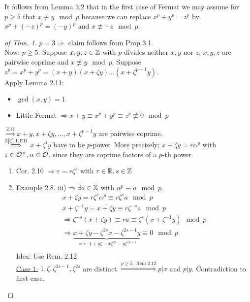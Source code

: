\begin{Bem}
It follows from Lemma 3.2 that in the first case of Fermat we may assume for $p \geq 5$ that $x \not\equiv y \mod p$ because we can replace $x^p + y^p = z^p $ by $x^p+(-z)^p=(-y)^p$ and $x \not\equiv -z \mod p$.
\end{Bem}

\begin{proof}[of Thm. 1]
$p=3 \Rightarrow $ claim follows from Prop 3.1.\\
Now: $p \geq 5$. Suppose $x,y,z \in \mathbb{Z}$ with $p$ divides neither $x,y$ nor $z$, $x,y,z$ are pairwise coprime and $x \not\equiv y \mod p$. Suppose $z^p = x^p +y^p=(x+y)(x+\zeta y)\dots (x+\zeta^{p-1}y)$.\\
Apply Lemma 2.11:
\begin{itemize}
\item $\gcd(x,y)=1$ \checkmark
\item Little Fermat $\Rightarrow x+y \equiv x^p+y^p\equiv z^p \not \equiv 0 \mod p$
\end{itemize}
$\stackrel{2.11}{\Longrightarrow} x+y, x+\zeta y, \dots, x+\zeta^{p-1}y$ are pairwise coprime.\\
$\stackrel{\mathbb{Z}[\zeta] \text{ UFD}}{\Longrightarrow}$ \glqq $x+\zeta^i y$ have to be $p$-power\grqq \ More precisely: $x+\zeta y = \varepsilon \alpha^p$ with $\varepsilon \in \mathcal{O}^\times, \alpha \in \mathcal{O}$, since they are coprime factors of a $p$-th power.
\begin{enumerate}
\item Cor. 2.10 $\Rightarrow \varepsilon = r \zeta^s$ with $r \in \mathbb{R}, s \in \mathbb{Z}$
\item Example 2.8. iii) $\Rightarrow \exists a \in \mathbb{Z}$ with $\alpha^p \equiv a \mod p$.
\begin{align*}
x + \zeta y = r \zeta^s \alpha^p \equiv r \zeta^s a \mod p\\
x+ \zeta^{-1} y = \overline{x+ \zeta y} \equiv r \zeta^{-s}a \mod p\\
\Rightarrow \zeta^{-s}(x+\zeta y) \equiv ra \equiv \zeta^s(x+\zeta^{-1}y) \mod p\\
\Rightarrow \underbrace{x+\zeta y - \zeta^{2s}x- \zeta^{2s-1}y}_{=x\cdot 1 + y \zeta -x \zeta^{2s} - y \zeta^{2s-1}} \equiv 0 \mod p\\
\end{align*}
Idea: Use Rem. 2.12\\
\underline{Case 1:} $1, \zeta, \zeta^{2s-1}, \zeta^{2s}$ are distinct $\stackrel{p \geq 5, \text{ Rem 2.12}}{\Longrightarrow} p | x$ and $p | y$.  Contradiction to first case.
\end{enumerate}
\end{proof}